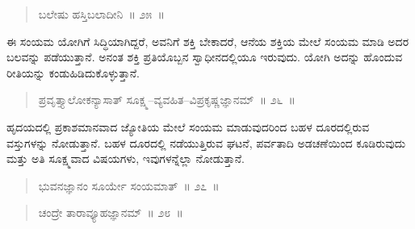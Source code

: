 \vspace{-0.3cm}


\vspace{-0.3cm}

\begin{verse}
ಬಲೇಷು ಹಸ್ತಿಬಲಾದೀನಿ~॥ ೨೫~॥
\end{verse}

\vspace{-0.3cm}


ಈ ಸಂಯಮ ಯೋಗಿಗೆ ಸಿದ್ಧಿಯಾಗಿದ್ದರೆ, ಅವನಿಗೆ ಶಕ್ತಿ ಬೇಕಾದರೆ, ಆನೆಯ ಶಕ್ತಿಯ ಮೇಲೆ ಸಂಯಮ ಮಾಡಿ ಅದರ ಬಲವನ್ನು ಪಡೆಯುತ್ತಾನೆ. ಅನಂತ ಶಕ್ತಿ ಪ್ರತಿಯೊಬ್ಬನ ಸ್ವಾಧೀನದಲ್ಲಿಯೂ ಇರುವುದು. ಯೋಗಿ ಅದನ್ನು ಹೊಂದುವ ರೀತಿಯನ್ನು ಕಂಡುಹಿಡಿದುಕೊಳ್ಳುತ್ತಾನೆ. 

\vspace{-0.3cm}

\begin{verse}
ಪ್ರವೃತ್ತ್ಯಾಲೋಕನ್ಯಾಸಾತ್​ ಸೂಕ್ಷ್ಮ–ವ್ಯವಹಿತ–ವಿಪ್ರಕೃಷ್ಣಜ್ಞಾನಮ್​~॥ ೨೬~॥
\end{verse}

\vspace{-0.3cm}


ಹೃದಯದಲ್ಲಿ ಪ್ರಕಾಶಮಾನವಾದ ಜ್ಯೋತಿಯ ಮೇಲೆ ಸಂಯಮ ಮಾಡುವುದರಿಂದ ಬಹಳ ದೂರದಲ್ಲಿರುವ ವಸ್ತುಗಳನ್ನು ನೋಡುತ್ತಾನೆ. ಬಹಳ ದೂರದಲ್ಲಿ ನಡೆಯುತ್ತಿರುವ ಘಟನೆ, ಪರ್ವತಾದಿ ಅಡಚಣೆಯಿಂದ ಕೂಡಿರುವುದು ಮತ್ತು ಅತಿ ಸೂಕ್ಷ್ಮವಾದ ವಿಷಯಗಳು, ಇವುಗಳನ್ನೆಲ್ಲಾ ನೋಡುತ್ತಾನೆ. 

\vspace{-0.3cm}

\begin{verse}
ಭುವನಜ್ಞಾನಂ ಸೂರ್ಯೇ ಸಂಯಮಾತ್​~॥ ೨೭~॥
\end{verse}

\vspace{-0.3cm}


\vspace{-0.3cm}

\begin{verse}
ಚಂದ್ರೇ ತಾರಾವ್ಯೂಹಜ್ಞಾನಮ್​~॥ ೨೮~॥
\end{verse}

\vspace{-0.3cm}

